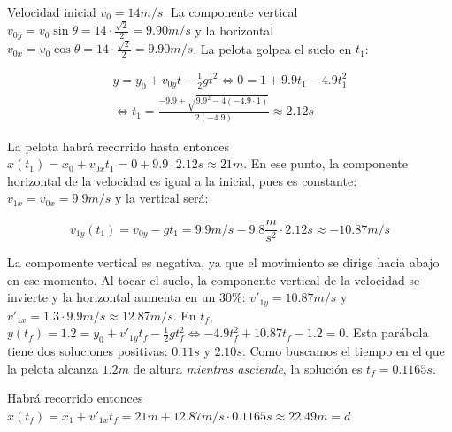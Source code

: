 \begin{solucion}
    Velocidad inicial $v_0 = 14m/s$. La componente vertical $v_{0y} = v_0 \sin \theta = 14 \cdot \frac{\sqrt{2}}{2} = 9.90 m/s$ y la horizontal $v_{0x} = v_0 \cos \theta = 14 \cdot \frac{\sqrt{2}}{2} = 9.90 m/s$. La pelota golpea el suelo en $t_1$:

    \begin{gather*}
        y = y_0 + v_{0y}t - \frac{1}{2}g t^2 \Leftrightarrow 0 = 1 + 9.9t_1 - 4.9t_1^2 \\
        \Leftrightarrow t_1 = \frac{-9.9 \pm \sqrt{9.9^2 - 4(-4.9\cdot 1)}}{2(-4.9)} \approx 2.12s
    \end{gather*}

    La pelota habrá recorrido hasta entonces $x(t_1) = x_0 + v_{0x}t_1 = 0 + 9.9 \cdot 2.12s \approx 21m$. En ese punto, la componente horizontal de la velocidad es igual a la inicial, pues es constante: $v_{1x} = v_{0x} = 9.9m/s$ y la vertical será:

    \begin{equation*}
        v_{1y}(t_1) = v_{0y} - gt_1 = 9.9m/s - 9.8\frac{m}{s^2} \cdot 2.12s \approx -10.87m/s
    \end{equation*}

    La compomente vertical es negativa, ya que el movimiento se dirige hacia abajo en ese momento. Al tocar el suelo, la componente vertical de la velocidad se invierte y la horizontal aumenta en un 30\%: $v'_{1y} = 10.87m/s$ y $v'_{1x} = 1.3 \cdot 9.9m/s \approx 12.87 m/s$. En $t_f$, $y(t_f) = 1.2 = y_0 + v'_{1y} t_f - \frac{1}{2}g t_f^2 \Leftrightarrow -4.9 t_f^2 + 10.87 t_f -1.2 = 0$. Esta parábola tiene dos soluciones positivas: $0.11s$ y $2.10s$. Como buscamos el tiempo en el que la pelota alcanza $1.2m$ de altura \textit{mientras asciende}, la solución es $t_f = 0.1165s$.

    Habrá recorrido entonces $x(t_f) = x_1 + v'_{1x}t_f = 21m + 12.87m/s \cdot 0.1165s \approx 22.49m = d$
\end{solucion}


